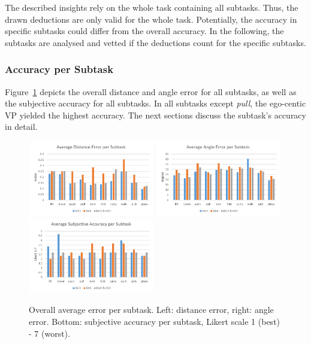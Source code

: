 The described insights rely on the whole task containing all subtasks. Thus, the drawn deductions are only valid for the whole task. Potentially, the accuracy in specific subtasks could differ from the overall accuracy. In the following, the subtasks are analysed and vetted if the deductions count for the specific subtasks.

\subsubsection{Accuracy per Subtask}
\label{sec:evalAccSubtask}
Figure~\ref{fig:avgErrorPerSubTask} depicts the overall distance and angle error for all subtasks, as well as the subjective accuracy for all subtasks. In all subtasks except \textit{pull}, the ego-centic VP yielded the highest accuracy. The next sections discuss the subtask's accuracy in detail.
\begin{figure}[H]
	\centering
	\includegraphics[width=0.49\textwidth]{figures/averageDistanceErrorPerSubTask.png}
	\includegraphics[width=0.49\textwidth]{figures/averageAngleErrorPerSubTask.png}
	\includegraphics[width=0.49\textwidth]{figures/subjectiveAccuracyBySubTask.png}
	\caption[Overall accuracy per subtask]{Overall average error per subtask. Left: distance error, right: angle error. Bottom: subjective accuracy per subtask, Likert scale 1 (best) - 7 (worst).}
	\label{fig:avgErrorPerSubTask}
\end{figure}

